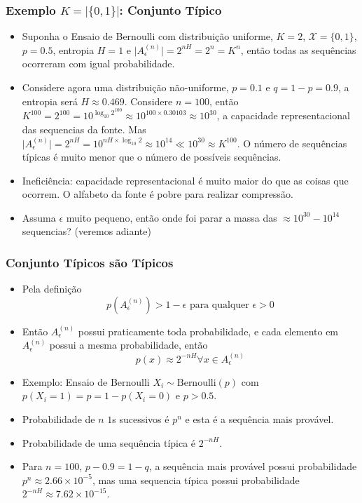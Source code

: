 \begin{frame}%
  \frametitle{Exemplo $K=\vert \{0,1\} \vert$: Conjunto Típico}
  \begin{itemize}
  \item Suponha o Ensaio de Bernoulli com distribuição uniforme, $K=2$, 
        $\mathcal{X} = \{0,1\}$, $p=0.5$, entropia $H=1$ e
        $\vert A_\epsilon^{(n)} \vert = 2^{nH} = 2^n = K^n$, 
        então todas as sequências ocorreram com igual probabilidade.
  \item Considere agora uma distribuição não-uniforme, $p=0.1$ e $q=1-p=0.9$, a entropia será
        $H\approx 0.469$. Considere $n=100$, então 
        $K^{100} = 2^{100} = 10^{\log_{10} 2^{100}} \approx 10^{100 \times 0.30103} \approx 10^{30}$,
        a capacidade representacional das sequencias da fonte. 
        Mas $\vert A_\epsilon^{(n)} \vert = 2^{nH} = 10^{nH \times \log_{10} 2} \approx 10^{14} \ll 10^{30} \approx K^{100}$. 
        O número de sequências típicas é muito menor que o número de possíveis sequências.
  \item Ineficiência: capacidade representacional é muito maior do que as coisas que ocorrem.
        O alfabeto da fonte é pobre para realizar compressão.
  \item Assuma $\epsilon$ muito pequeno, então onde foi parar a massa das $\approx 10^{30} - 10^{14}$ 
        sequencias? (veremos adiante)
  \end{itemize}
\end{frame}


\begin{frame}%
  \frametitle{Conjunto Típicos são Típicos}
  \begin{itemize}
  \item Pela definição
        \begin{equation}
        p(A_\epsilon^{(n)}) > 1 - \epsilon \text{ para qualquer } \epsilon > 0
        \end{equation}
  \item Então $A_\epsilon^{(n)}$ possui praticamente toda probabilidade, e cada elemento
        em $A_\epsilon^{(n)}$ possui a mesma probabilidade, então
        \begin{equation}
        p(x) \approx 2^{-nH} \forall x \in A_\epsilon^{(n)}
        \end{equation}
  \item Exemplo: Ensaio de Bernoulli $X_i \sim \text{Bernoulli}(p)$ com 
        $p(X_i = 1) = p = 1 - p(X_i = 0)$ e $p>0.5$.
  \item Probabilidade de $n$ $1$s sucessivos é $p^n$ e esta é a sequência mais provável.
  \item Probabilidade de uma sequência típica é $2^{-nH}$.
  \item Para $n=100$, $p-0.9 = 1 - q$, a sequência mais provável possui probabilidade
        $p^n \approx 2.66 \times 10^{-5}$, mas uma sequencia típica possui probabilidade
        $2^{-nH} \approx 7.62 \times 10^{-15}$.
  \end{itemize}
\end{frame}

